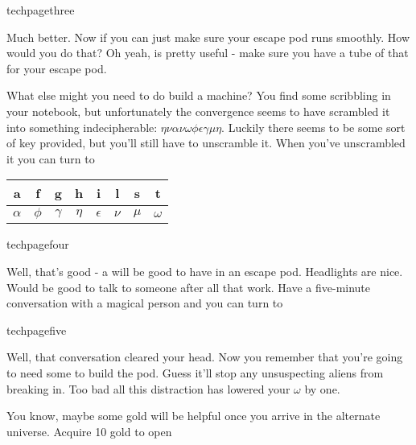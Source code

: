 \documentclass[greennotebook]{guildcamp3} %
\begin{document}
\begin{page}{techpagethree}
	
Much better. Now if you can just make sure your escape pod runs smoothly. How would you do that? Oh yeah, \iGraphiteLube{} is pretty useful - make sure you have a tube of that for your escape pod. 

What else might you need to do build a machine? You find some scribbling in your notebook, but unfortunately the convergence seems to have scrambled it into something indecipherable: $\eta \nu \alpha \nu \omega \phi \epsilon \gamma \mu \eta$. Luckily there seems to be some sort of key provided, but you'll still have to unscramble it. When you've unscrambled it you can turn to 

\begin{tabular}{|c|c|c|c|c|c|c|c|}
	\hline \rule[-2ex]{0pt}{5.5ex} a & f & g & h & i & l & s & t \\ 
	\hline \rule[-2ex]{0pt}{5.5ex} $\alpha$ & $\phi$ & $\gamma$ & $\eta$ & $\epsilon$ & $\nu$ & $\mu$ & $\omega$ \\ 
	\hline 
\end{tabular} 	
\end{page}

\begin{page}{techpagefour}
	
Well, that's good - a \iFlashlight{} will be good to have in an escape pod. Headlights are nice. Would be good to talk to someone after all that work. Have a five-minute conversation with a magical person and you can turn to 
	
\end{page}

\begin{page}{techpagefive}

Well, that conversation cleared your head. Now you remember that you're going to need some \iNiobiumCarbide{} to build the pod. Guess it'll stop any unsuspecting aliens from breaking in. Too bad all this distraction has lowered your $\omega$ by one. 

You know, maybe some gold will be helpful once you arrive in the alternate universe. Acquire 10 gold to open 
	
\end{page}
\end{document}
